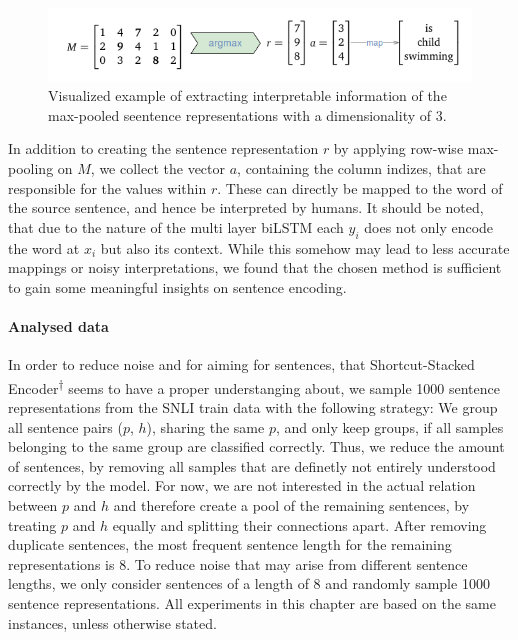 \begin{figure}[tph!]
\centering
	\includegraphics[totalheight=2cm]{fig/example_process_understanding.png}
	\caption{Visualized example of extracting interpretable information of the max-pooled seentence representations with a dimensionality of 3.}
	\label{fig:example_process_understanding}
\end{figure}
In addition to creating the sentence representation $r$ by applying row-wise max-pooling on $M$, we collect the vector $a$, containing the column indizes, that are responsible for the values within $r$. These can directly be mapped to the word of the source sentence, and hence be interpreted by humans. It should be noted, that due to the nature of the multi layer \ac{biLSTM} each $y_i$ does not only encode the word at $x_i$ but also its context. While this somehow may lead to less accurate mappings or noisy interpretations, we found that the chosen method is sufficient to gain some meaningful insights on sentence encoding.

\paragraph*{Analysed data}\label{sec:understanding1_analysed_data}
In order to reduce noise and for aiming for sentences, that Shortcut-Stacked Encoder\textsuperscript{$\dagger$} seems to have a proper understanging about, we sample 1000 sentence representations from the \ac{SNLI} train data with the following strategy: We group all sentence pairs ($p$, $h$), sharing the same $p$, and only keep groups, if all samples belonging to the same group are classified correctly. Thus, we reduce the amount of sentences, by removing all samples that are definetly not entirely understood correctly by the model. For now, we are not interested in the actual relation between $p$ and $h$ and therefore create a pool of the remaining sentences, by treating $p$ and $h$ equally and splitting their connections apart. After removing duplicate sentences, the most frequent sentence length for the remaining representations is 8. To reduce noise that may arise from different sentence lengths, we only consider sentences of a length of 8 and randomly sample 1000 sentence representations. All experiments in this chapter are based on the same instances, unless otherwise stated.
\newline

